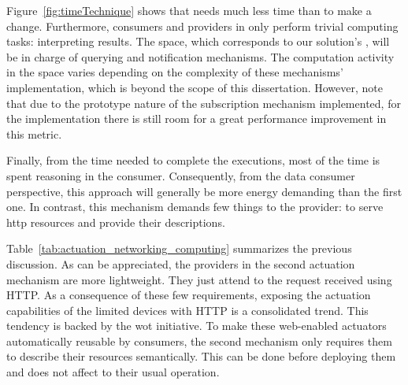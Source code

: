 

Figure~\ref{fig:timeTechnique} shows that \spaceActuation{} needs much less time than \restActuation{} to make a change.
Furthermore, consumers and providers in \spaceActuation{} only perform trivial computing tasks: interpreting results. %
The space, which corresponds to our solution's \coordspace{}, will be in charge of querying and notification mechanisms.
The computation activity in the space varies depending on the complexity of these mechanisms' implementation, which is beyond the scope of this dissertation.
However, note that due to the prototype nature of the subscription mechanism implemented, for the \spaceActuation{} implementation there is still room for a great performance improvement in this metric. %


Finally, from the time needed to complete the \restActuation{} executions, most of the time is spent reasoning in the consumer.
Consequently, from the data consumer perspective, this approach will generally be more energy demanding than the first one. %
In contrast, this mechanism demands few things to the provider: to serve \ac{http} resources and provide their descriptions. %


\bigskip





Table~\ref{tab:actuation_networking_computing} summarizes the previous discussion.
As can be appreciated, the providers in the second actuation mechanism are more lightweight.
They just attend to the request received using HTTP.
As a consequence of these few requirements, exposing the actuation capabilities of the limited devices with HTTP is a consolidated trend.
This tendency is backed by the \ac{wot} initiative.
To make these web-enabled actuators automatically reusable by consumers, the second mechanism only requires them to describe their resources semantically.
This can be done before deploying them and does not affect to their usual operation.


